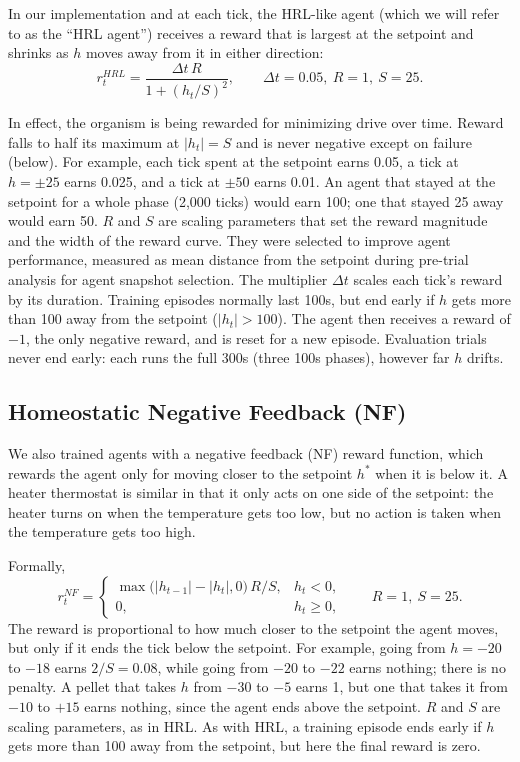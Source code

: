 \documentclass[12pt,fleqn]{article}
\begin{document}
In our implementation and at each tick, the HRL-like agent (which we will refer to as the ``HRL agent'') receives a reward that is largest at the setpoint and shrinks as $h$ moves away from it in either direction:
\begin{equation}\label{eq:reward-hrl}
  r_t^{HRL}=\frac{\Delta t\,R}{1+(h_t/S)^2},\qquad \Delta t=0.05,\ R=1,\ S=25.
\end{equation}

In effect, the organism is being rewarded for minimizing drive over time. Reward falls to half its maximum at $|h_t|=S$ and is never negative except on failure (below). For example, each tick spent at the setpoint earns 0.05, a tick at $h=\pm25$ earns 0.025, and a tick at $\pm50$ earns 0.01. An agent that stayed at the setpoint for a whole phase (2,000 ticks) would earn 100; one that stayed 25 away would earn 50. $R$ and $S$ are scaling parameters that set the reward magnitude and the width of the reward curve. They were selected to improve agent performance, measured as mean distance from the setpoint during pre-trial analysis for agent snapshot selection. The multiplier $\Delta t$ scales each tick's reward by its duration. Training episodes normally last 100s, but end early if $h$ gets more than 100 away from the setpoint ($|h_t|>100$). The agent then receives a reward of $-1$, the only negative reward, and is reset for a new episode. Evaluation trials never end early: each runs the full 300s (three 100s phases), however far $h$ drifts.

\subsection{Homeostatic Negative Feedback (NF)}\label{sec:nf}

We also trained agents with a negative feedback (NF) reward function, which rewards the agent only for moving closer to the setpoint $h^*$ when it is below it. A heater thermostat is similar in that it only acts on one side of the setpoint: the heater turns on when the temperature gets too low, but no action is taken when the temperature gets too high.

Formally,
\begin{equation}\label{eq:reward-nf}
  r_t^{NF}=\begin{cases}
    \max\bigl(|h_{t-1}|-|h_t|,0\bigr)\,R/S,& h_t<0,\\
    0,& h_t\geq0,
  \end{cases}
  \qquad R=1,\ S=25.
\end{equation}
The reward is proportional to how much closer to the setpoint the agent moves, but only if it ends the tick below the setpoint. For example, going from $h=-20$ to $-18$ earns $2/S=0.08$, while going from $-20$ to $-22$ earns nothing; there is no penalty. A pellet that takes $h$ from $-30$ to $-5$ earns 1, but one that takes it from $-10$ to $+15$ earns nothing, since the agent ends above the setpoint. $R$ and $S$ are scaling parameters, as in HRL. As with HRL, a training episode ends early if $h$ gets more than 100 away from the setpoint, but here the final reward is zero.
\end{document}
